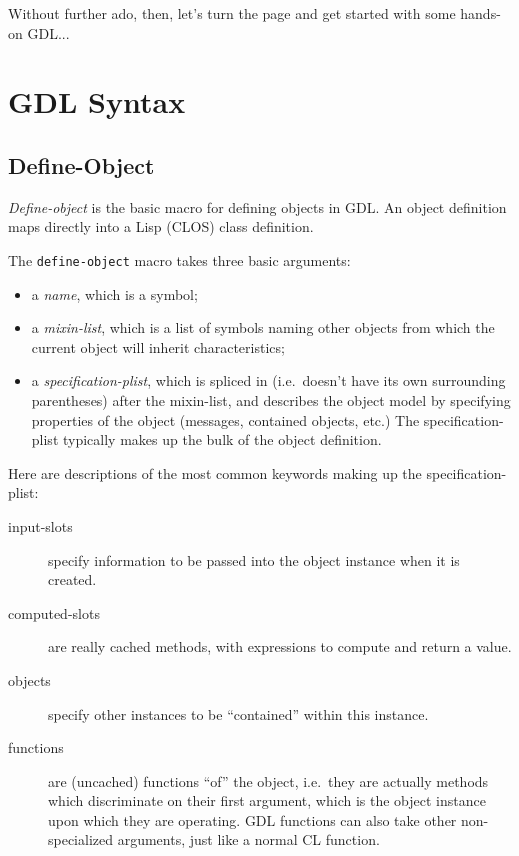 \documentclass [11pt]{book}
\begin{document}
Without further ado, then, let's turn the page and get started with some hands-on GDL...

\chapter{GDL Syntax}

\label{chap:gdlsyntax}



\section{Define-Object}

\label{sec:define-object}

\emph{Define-object} is the basic macro for defining objects in GDL. An object 
definition maps directly into a Lisp (CLOS) class definition. 

The \texttt{define-object} macro takes three basic arguments:

\begin{itemize}

\item a \emph{name}, which is a symbol;

\item a \emph{mixin-list}, which is a list of symbols naming other objects from which the current object 
will inherit characteristics;

\item a \emph{specification-plist}, which is spliced in (i.e.\ doesn't have its own surrounding 
parentheses) after the mixin-list, and describes
the object model by specifying properties of the object (messages, contained objects, etc.)
The specification-plist typically makes up the bulk of the object definition.

\end{itemize}



Here are descriptions of the most common keywords making up the specification-plist:

\begin{description}

\item [input-slots]
specify information to be passed into the object instance when it is created.

\item [computed-slots]
are really cached methods, with expressions to compute and return a value.

\item [objects]
specify other instances to be ``contained'' within this instance.

\item [functions]
are (uncached) functions ``of'' the object, i.e.\ they are actually methods which
discriminate on their first argument, which is the object instance upon which they are operating. 
GDL functions can also take other non-specialized arguments, just like a normal CL function.

\end{description}
\end{document}
